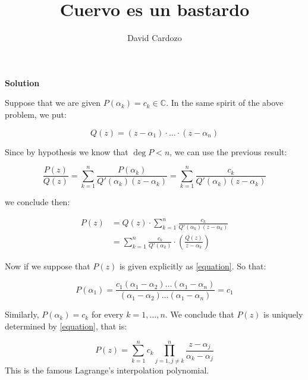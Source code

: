 \documentclass[notitlepage]{report}
\author{David Cardozo}
\title{Cuervo es un bastardo}
\newcommand{\lrp}[1]{\left( #1 \right)}
\newcommand{\CC}{\mathbb{C}}
\begin{document}
\maketitle

\item
	

\textbf{Solution}

Suppose that we are given $ P(\alpha_k) = c_k \in \CC $. In the same spirit of the above problem, we put:

\[ Q(z) = (z-\alpha_1)\cdot \ldots \cdot (z- \alpha_n) \]

Since by hypothesis we know that $ \operatorname{deg}P < n $, we can use the previous result:

\[ \frac{P(z)}{Q(z)} = \sum_{k=1}^{n} \frac{P(\alpha_k)}{Q'(\alpha_k)(z -\alpha_k)} = \sum_{k=1}^{n} \frac{c_k}{Q'(\alpha_k)(z - \alpha_k)} \]

we conclude then:

\begin{align}
 P(z) &= Q(z) \cdot \sum_{k =1}^{n} \frac{c_k}{Q'(\alpha_k)(z-\alpha_k)} \\
 &= \sum_{k=1}^{n} \frac{c_k}{Q'(\alpha_k)} \cdot \lrp{\frac{Q(z)}{z-\alpha_k}} \label{equation}
\end{align}

Now if we suppose that $ P(z) $ is given explicitly as \eqref{equation}. So that:

\[ P(\alpha_1) = \frac{c_1(\alpha_1 - \alpha_2) \ldots (\alpha_1 - \alpha_n)}{(\alpha_1 - \alpha_2) \ldots (\alpha_1 - \alpha_n)} = c_1 \]

Similarly, $ P(\alpha_k) = c_k $ for every $ k = 1, \ldots, n $. We conclude that $ P(z) $ is uniquely determined by \eqref{equation}, that is:

\[ P(z) = \sum_{k=1}^{n} c_k \prod_{j=1, j \neq k}^{n} \frac{z - \alpha_j}{\alpha_k - \alpha_j} \]
This is the famous Lagrange's interpolation polynomial.
\end{document}
